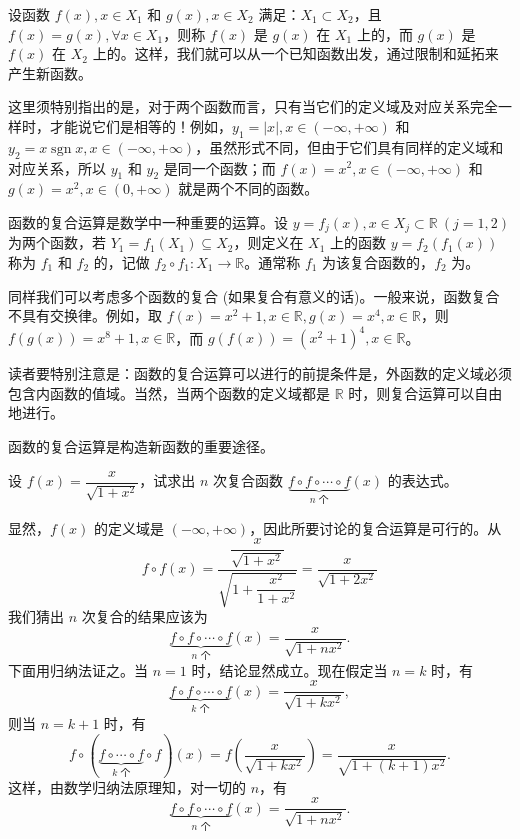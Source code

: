 \documentclass[UTF8,12pt,a4paper,fontset=fandol]{ctexbook}
\begin{document}
\noindent{}

设函数 $f(x),x\in X_1$ 和 $g(x),x\in X_2$ 满足：$X_1\subset X_2$，且 $f(x)=g(x),\forall x\in X_1$，则称 $f(x)$ 是 $g(x)$ 在 $X_1$ 上的，而 $g(x)$ 是 $f(x)$ 在 $X_2$ 上的。这样，我们就可以从一个已知函数出发，通过限制和延拓来产生新函数。

这里须特别指出的是，对于两个函数而言，只有当它们的定义域及对应关系完全一样时，才能说它们是相等的！例如，$y_1=|x|,x\in(-\infty,+\infty)$ 和 $y_2=x\operatorname{sgn}x,x\in(-\infty,+\infty)$，虽然形式不同，但由于它们具有同样的定义域和对应关系，所以 $y_1$ 和 $y_2$ 是同一个函数；而 $f(x)=x^2,x\in(-\infty,+\infty)$ 和 $g(x)=x^2,x\in(0,+\infty)$ 就是两个不同的函数。

\noindent{}

函数的复合运算是数学中一种重要的运算。设 $y=f_j(x),x\in X_j\subset\mathbb{R}\ (j=1,2)$ 为两个函数，若 $Y_1=f_1(X_1)\subseteq X_2$，则定义在 $X_1$ 上的函数 $y=f_2(f_1(x))$ 称为 $f_1$ 和 $f_2$ 的，记做 $f_2\circ f_1:X_1\to\mathbb{R}$。通常称 $f_1$ 为该复合函数的，$f_2$ 为。

同样我们可以考虑多个函数的复合 (如果复合有意义的话)。一般来说，函数复合不具有交换律。例如，取 $f(x)=x^2+1,x\in\mathbb{R},g(x)=x^4,x\in\mathbb{R}$，则 $f(g(x))=x^8+1,x\in\mathbb{R}$，而 $g(f(x))=(x^2+1)^4,x\in\mathbb{R}$。

读者要特别注意是：函数的复合运算可以进行的前提条件是，外函数的定义域必须包含内函数的值域。当然，当两个函数的定义域都是 $\mathbb{R}$ 时，则复合运算可以自由地进行。

函数的复合运算是构造新函数的重要途径。

\noindent{}\quad 设 $f(x)=\dfrac{x}{\sqrt{1+x^2}}$，试求出 $n$ 次复合函数 $\underbrace{f\circ f\circ\cdots\circ f}_{n\text{ 个}}(x)$ 的表达式。

\noindent{}\quad 显然，$f(x)$ 的定义域是 $(-\infty,+\infty)$，因此所要讨论的复合运算是可行的。从
\[
  f\circ f(x)=
  \frac{\dfrac{x}{\sqrt{1+x^2}}}{\sqrt{1+\dfrac{x^2}{1+x^2}}}
  =\frac{x}{\sqrt{1+2x^2}}
\]
我们猜出 $n$ 次复合的结果应该为
\[
  \underbrace{f\circ f\circ\cdots\circ f}_{n\text{ 个}}(x)=\frac{x}{\sqrt{1+nx^2}}.
\]
下面用归纳法证之。当 $n=1$ 时，结论显然成立。现在假定当 $n=k$ 时，有
\[
  \underbrace{f\circ f\circ\cdots\circ f}_{k\text{ 个}}(x)=\frac{x}{\sqrt{1+kx^2}},
\]
则当 $n=k+1$ 时，有
\[
  f\circ(\underbrace{f\circ\cdots\circ f}_{k\text{ 个}}\circ f)(x)
  =f\left(\frac{x}{\sqrt{1+kx^2}}\right)
  =\frac{x}{\sqrt{1+(k+1)x^2}}.
\]
这样，由数学归纳法原理知，对一切的 $n$，有
\[
  \underbrace{f\circ f\circ\cdots\circ f}_{n\text{ 个}}(x)=\frac{x}{\sqrt{1+nx^2}}.
\]
\end{document}

